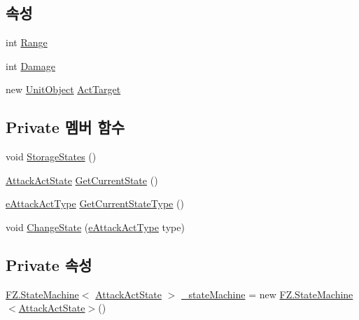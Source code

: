 \subsection*{속성}
\begin{DoxyCompactItemize}
\item 
int \hyperlink{class_attack_actor_aa331a3d1fbebd46a2458c64b209af927}{Range}
\item 
int \hyperlink{class_attack_actor_aaa126531b12eeb6d03311d761697cc84}{Damage}
\item 
new \hyperlink{class_unit_object}{Unit\+Object} \hyperlink{class_f_z_1_1_unit_obj_actor_a9343320a7b31731b88fa6ab91d649328}{Act\+Target}
\end{DoxyCompactItemize}
\subsection*{Private 멤버 함수}
\begin{DoxyCompactItemize}
\item 
void \hyperlink{class_attack_actor_a4c1408e09de62ad12b42bee3251556ba}{Storage\+States} ()
\item 
\hyperlink{class_attack_actor_1_1_attack_act_state}{Attack\+Act\+State} \hyperlink{class_attack_actor_ac231e370a4747dc36886f4158b289898}{Get\+Current\+State} ()
\item 
\hyperlink{_attack_actor_8cs_a10659ce944335df4ded984f6bc41f31b}{e\+Attack\+Act\+Type} \hyperlink{class_attack_actor_aab8bdc29ed7dae173129dbb09c9b8913}{Get\+Current\+State\+Type} ()
\item 
void \hyperlink{class_attack_actor_a97035efd9d67dd78cfa55cf321426567}{Change\+State} (\hyperlink{_attack_actor_8cs_a10659ce944335df4ded984f6bc41f31b}{e\+Attack\+Act\+Type} type)
\end{DoxyCompactItemize}
\subsection*{Private 속성}
\begin{DoxyCompactItemize}
\item 
\hyperlink{class_f_z_1_1_state_machine}{F\+Z.\+State\+Machine}$<$ \hyperlink{class_attack_actor_1_1_attack_act_state}{Attack\+Act\+State} $>$ \hyperlink{class_attack_actor_ae8b11071e5df53e1bda6649bd9075571}{\+\_\+state\+Machine} = new \hyperlink{class_f_z_1_1_state_machine}{F\+Z.\+State\+Machine}$<$\hyperlink{class_attack_actor_1_1_attack_act_state}{Attack\+Act\+State}$>$()
\end{DoxyCompactItemize}


